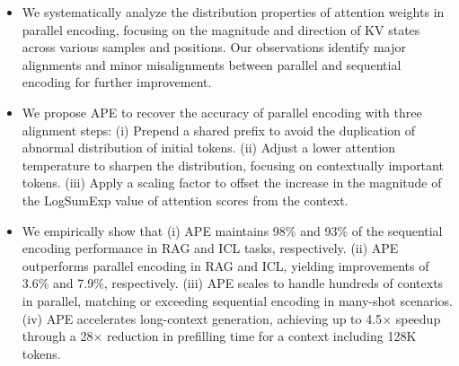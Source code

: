 \begin{itemize}
[itemsep=0.0pt,topsep=0pt,leftmargin=*]
\item We systematically analyze the distribution properties of attention weights in parallel encoding, focusing on the magnitude and direction of KV states across various samples and positions. Our observations identify major alignments and minor misalignments between parallel and sequential encoding for further improvement.
\item We propose APE to recover the accuracy of parallel encoding with three alignment steps: (i) Prepend a shared prefix to avoid the duplication of abnormal distribution of initial tokens. (ii) Adjust a lower attention temperature to sharpen the distribution, focusing on contextually important tokens. (iii) Apply a scaling factor to offset the increase in the magnitude of the LogSumExp value of attention scores from the context.
\item  We empirically show that (i) APE maintains 98\% and 93\% of the sequential encoding performance in RAG and ICL tasks, respectively. (ii) APE outperforms parallel encoding in RAG and ICL, yielding improvements of 3.6\% and 7.9\%, respectively. (iii) APE scales to handle hundreds of contexts in parallel, matching or exceeding sequential encoding in many-shot scenarios. (iv) APE accelerates long-context generation, achieving up to 4.5$\times$ speedup through a 28$\times$ reduction in prefilling time for a context including 128K tokens.
\end{itemize} 
